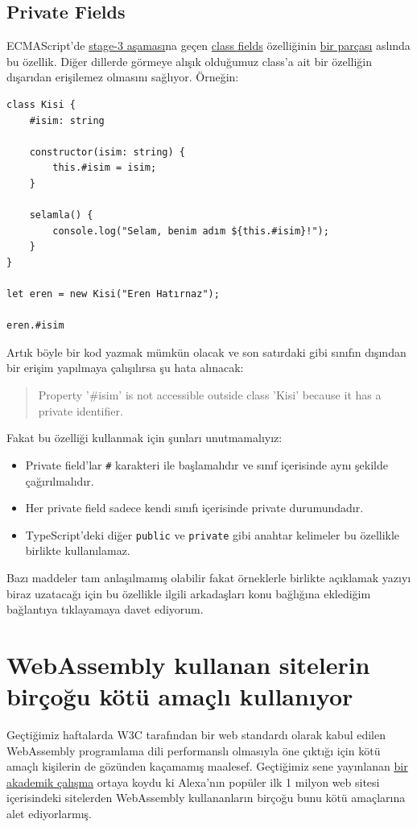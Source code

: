 \documentclass[11pt]{article}
\begin{document}
\subsection{Private Fields}
\label{sec:org84781f3}
ECMAScript'de \href{https://tc39.es/process-document/}{stage-3 aşaması}na geçen \href{https://github.com/tc39/proposal-class-fields/}{class fields} özelliğinin \href{https://github.com/tc39/proposal-class-fields/\#private-fields}{bir parçası}
aslında bu özellik. Diğer dillerde görmeye alışık olduğumuz class'a ait bir
özelliğin dışarıdan erişilemez olmasını sağlıyor. Örneğin:
\begin{verbatim}
class Kisi {
    #isim: string

    constructor(isim: string) {
        this.#isim = isim;
    }

    selamla() {
        console.log("Selam, benim adım ${this.#isim}!");
    }
}

let eren = new Kisi("Eren Hatırnaz");

eren.#isim
\end{verbatim}
Artık böyle bir kod yazmak mümkün olacak ve son satırdaki gibi sınıfın dışından
bir erişim yapılmaya çalışılırsa şu hata alınacak:
\begin{quote}
Property '\#isim' is not accessible outside class 'Kisi' because it has a
private identifier.
\end{quote}
Fakat bu özelliği kullanmak için şunları unutmamalıyız:
\begin{itemize}
\item Private field'lar \texttt{\#} karakteri ile başlamalıdır ve sınıf içerisinde aynı
şekilde çağırılmalıdır.
\item Her private field sadece kendi sınıfı içerisinde private durumundadır.
\item TypeScript'deki diğer \texttt{public} ve \texttt{private} gibi anahtar kelimeler bu
özellikle birlikte kullanılamaz.
\end{itemize}
Bazı maddeler tam anlaşılmamış olabilir fakat örneklerle birlikte açıklamak
yazıyı biraz uzatacağı için bu özellikle ilgili arkadaşları konu bağlığına
eklediğim bağlantıya tıklayamaya davet ediyorum.
\section{WebAssembly kullanan sitelerin birçoğu kötü amaçlı kullanıyor}
\label{sec:org3c1ec1a}
Geçtiğimiz haftalarda W3C tarafından bir web standardı olarak kabul edilen
WebAssembly programlama dili performanslı olmasıyla öne çıktığı için kötü
amaçlı kişilerin de gözünden kaçamamış maalesef. Geçtiğimiz sene yayınlanan \href{https://www.sec.cs.tu-bs.de/pubs/2019a-dimva.pdf}{bir
akademik çalışma} ortaya koydu ki Alexa'nın popüler ilk 1 milyon web sitesi
içerisindeki sitelerden WebAssembly kullananların birçoğu bunu kötü amaçlarına
alet ediyorlarmış.
\end{document}
